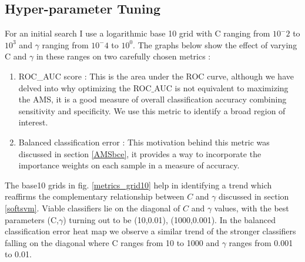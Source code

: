 \documentclass[final,3p,times,twocolumn]{elsarticle}
\begin{document}
\subsection{Hyper-parameter Tuning}

For an initial search I use a logarithmic base 10 grid with C ranging from $10^-2$ to $10^3 $ and $\gamma$ ranging from $10^-4$ to $10^0$. The graphs below show the effect of varying C and $\gamma$ in these ranges on two carefully chosen metrics : 

\begin{enumerate}
\item{ROC\_AUC score : This is the area under the ROC curve, although we have delved into why optimizing the ROC$\_$AUC is not equivalent to maximizing the AMS, it is a good measure of overall classification accuracy combining sensitivity and specificity. We use this metric to identify a broad region of interest.}
\item{Balanced classification error : This motivation behind this metric was discussed in section \ref{AMSbce}, it provides a way to incorporate the importance weights on each sample in a measure of accuracy.}
\end{enumerate}

The base10 grids in fig. \ref{metrics_grid10} help in identifying a trend which reaffirms the complementary relationship between $C$ and $\gamma$ discussed in section \ref{softsvm}. Viable classifiers lie on the diagonal of $C$ and $\gamma$ values, with the best parameters (C,$\gamma$) turning out to be (10,0.01), (1000,0.001). In the balanced classification error heat map we observe a similar trend of the stronger classifiers falling on the diagonal where C ranges from 10 to 1000 and $\gamma$ ranges from  0.001 to 0.01. 
\end{document}

